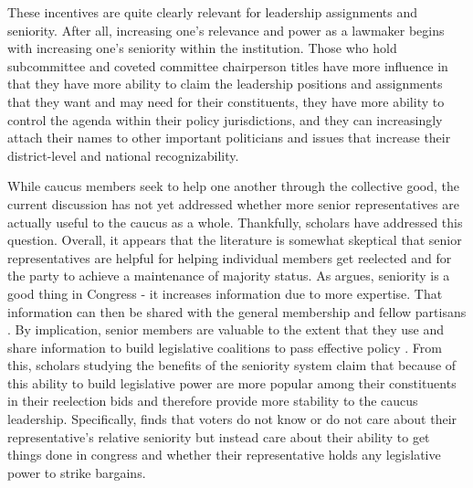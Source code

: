 \documentclass [12pt]{article}
\begin{document}
These incentives are quite clearly relevant for leadership assignments and seniority. After all, increasing one's relevance and power as a lawmaker begins with increasing one's seniority within the institution. Those who hold subcommittee and coveted committee chairperson titles have more influence in that they have more ability to claim the leadership positions and assignments that they want and may need for their constituents, they have more ability to control the agenda within their policy jurisdictions, and they can increasingly attach their names to other important politicians and issues that increase their district-level and national recognizability. 


While caucus members seek to help one another through the collective good, the current discussion has not yet addressed whether more senior representatives are actually useful to the caucus as a whole. Thankfully, scholars have addressed this question. Overall, it appears that the literature is somewhat skeptical that senior representatives are helpful for helping individual members get reelected and for the party to achieve a maintenance of majority status. As  argues, seniority is a good thing in Congress - it increases information due to more expertise. That information can then be shared with the general membership and fellow partisans \cite{Krehbiel1991}. By implication, senior members are valuable to the extent that they use and share information to build legislative coalitions to pass effective policy \cite{Taylor2019}. From this, scholars studying the benefits of the seniority system claim that because of this ability to build legislative power are more popular among their constituents in their reelection bids and therefore provide more stability to the caucus leadership. Specifically,  finds that voters do not know or do not care about their representative's relative seniority but instead care about their ability to get things done in congress and whether their representative holds any legislative power to strike bargains. 
\end{document}
